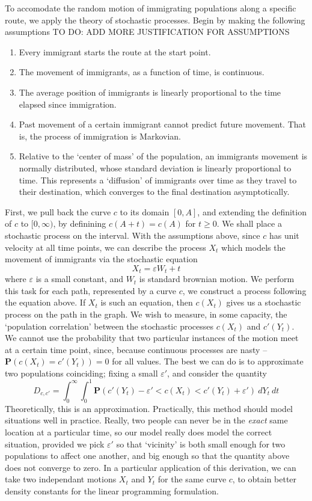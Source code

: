 \documentclass{article}
\begin{document}
To accomodate the random motion of immigrating populations along a specific route, we apply the theory of stochastic processes. Begin by making the following assumptions
%
TO DO: ADD MORE JUSTIFICATION FOR ASSUMPTIONS
%
\begin{enumerate}
    \item Every immigrant starts the route at the start point.
    \item The movement of immigrants, as a function of time, is continuous.
    \item The average position of immigrants is linearly proportional to the time elapsed since immigration.
    \item Past movement of a certain immigrant cannot predict future movement. That is, the process of immigration is Markovian.
    \item Relative to the `center of mass' of the population, an immigrants movement is normally distributed, whose standard deviation is linearly proportional to time. This represents a `diffusion' of immigrants over time as they travel to their destination, which converges to the final destination asymptotically.
\end{enumerate}
%
First, we pull back the curve $c$ to its domain $[0,A]$, and extending the definition of $c$ to $[0,\infty)$, by definining $c(A + t) = c(A)$ for $t \geq 0$. We shall place a stochastic process on the interval. With the assumptions above, since $c$ has unit velocity at all time points, we can describe the process $X_t$ which models the movement of immigrants via the stochastic equation
%
\[ X_t = \varepsilon W_t + t \]
%
where $\varepsilon$ is a small constant, and $W_t$ is standard brownian motion. We perform this task for each path, represented by a curve $c$, we construct a process following the equation above. If $X_t$ is such an equation, then $c(X_t)$ gives us a stochastic process on the path in the graph. We wish to measure, in some capacity, the `population correlation' between the stochastic processes $c(X_t)$ and $c'(Y_t)$. We cannot use the probability that two particular instances of the motion meet at a certain time point, since, because continuous processes are nasty -- $\mathbf{P}(c(X_t) = c'(Y_t)) = 0$ for all values. The best we can do is to approximate two populations coinciding; fixing a small $\varepsilon'$, and consider the quantity
%
\[ D_{c,c'} = \int_0^\infty \int_0^1 \mathbf{P}(c'(Y_t) - \varepsilon' < c(X_t) < c'(Y_t) + \varepsilon')\ dY_t\ dt \]
%
Theoretically, this is an approximation. Practically, this method should model situations well in practice. Really, two people can never be in the {\it exact} same location at a particular time, so our model really does model the correct situation, provided we pick $\varepsilon'$ so that `vicinity' is both small enough for two populations to affect one another, and big enough so that the quantity above does not converge to zero. In a particular application of this derivation, we can take two independant motions $X_t$ and $Y_t$ for the same curve $c$, to obtain better density constants for the linear programming formulation.
\end{document}
